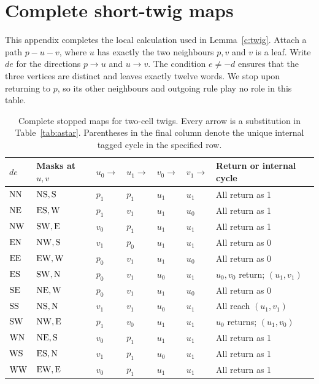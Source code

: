 \section{Complete short-twig maps}\label{c:twig-appendix}

This appendix completes the local calculation used in
Lemma~\ref{c:twig}. Attach a path \(p-u-v\), where \(u\) has exactly
the two neighbours \(p,v\) and \(v\) is a leaf. Write \(de\) for the
directions \(p\to u\) and \(u\to v\). The condition \(e\ne-d\)
ensures that the three vertices are distinct and leaves exactly twelve
words. We stop upon returning to \(p\), so its other neighbours and
outgoing rule play no role in this table.

\begin{table}[htbp]
\centering\small
\setlength{\tabcolsep}{4pt}
\begin{tabular}{lllllll}
\toprule
\(de\) & Masks at \(u,v\) & \(u_0\to\) & \(u_1\to\)
& \(v_0\to\) & \(v_1\to\) & Return or internal cycle \\
\midrule
\(\mathrm{N}\mathrm{N}\)&\(\mathrm{N}\mathrm{S},\mathrm{S}\)&\(p_1\)&\(p_1\)&\(u_1\)&\(u_1\)&All return as 1\\
\(\mathrm{N}\mathrm{E}\)&\(\mathrm{E}\mathrm{S},\mathrm{W}\)&\(p_1\)&\(v_1\)&\(u_1\)&\(u_0\)&All return as 1\\
\(\mathrm{N}\mathrm{W}\)&\(\mathrm{S}\mathrm{W},\mathrm{E}\)&\(v_0\)&\(p_1\)&\(u_1\)&\(u_1\)&All return as 1\\
\(\mathrm{E}\mathrm{N}\)&\(\mathrm{N}\mathrm{W},\mathrm{S}\)&\(v_1\)&\(p_0\)&\(u_1\)&\(u_1\)&All return as 0\\
\(\mathrm{E}\mathrm{E}\)&\(\mathrm{E}\mathrm{W},\mathrm{W}\)&\(p_0\)&\(v_1\)&\(u_1\)&\(u_0\)&All return as 0\\
\(\mathrm{E}\mathrm{S}\)&\(\mathrm{S}\mathrm{W},\mathrm{N}\)&\(p_0\)&\(v_1\)&\(u_0\)&\(u_1\)&\(u_0,v_0\) return; \((u_1,v_1)\)\\
\(\mathrm{S}\mathrm{E}\)&\(\mathrm{N}\mathrm{E},\mathrm{W}\)&\(p_0\)&\(v_1\)&\(u_1\)&\(u_0\)&All return as 0\\
\(\mathrm{S}\mathrm{S}\)&\(\mathrm{N}\mathrm{S},\mathrm{N}\)&\(v_1\)&\(v_1\)&\(u_0\)&\(u_1\)&All reach \((u_1,v_1)\)\\
\(\mathrm{S}\mathrm{W}\)&\(\mathrm{N}\mathrm{W},\mathrm{E}\)&\(p_1\)&\(v_0\)&\(u_1\)&\(u_1\)&\(u_0\) returns; \((u_1,v_0)\)\\
\(\mathrm{W}\mathrm{N}\)&\(\mathrm{N}\mathrm{E},\mathrm{S}\)&\(v_0\)&\(p_1\)&\(u_1\)&\(u_1\)&All return as 1\\
\(\mathrm{W}\mathrm{S}\)&\(\mathrm{E}\mathrm{S},\mathrm{N}\)&\(v_1\)&\(p_1\)&\(u_0\)&\(u_1\)&All return as 1\\
\(\mathrm{W}\mathrm{W}\)&\(\mathrm{E}\mathrm{W},\mathrm{E}\)&\(v_0\)&\(p_1\)&\(u_1\)&\(u_1\)&All return as 1\\
\bottomrule
\end{tabular}
\caption{Complete stopped maps for two-cell twigs. Every arrow is a
substitution in Table~\ref{tab:astar}. Parentheses in the final column
denote the unique internal tagged cycle in the specified row.}
\label{c:twig-table}
\end{table}

